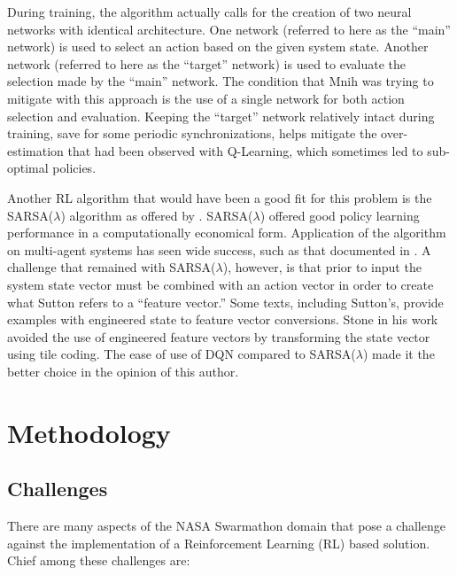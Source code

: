 \documentclass[sigconf,authordraft]{acmart}
\begin{document}
During training, the algorithm actually calls for the creation of two neural networks with identical architecture. One network (referred to here as the ``main'' network) is used to select an action based on the given system state. Another network (referred to here as the ``target'' network) is used to evaluate the selection made by the ``main'' network. The condition that Mnih was trying to mitigate with this approach is the use of a single network for both action selection and evaluation. Keeping the ``target'' network relatively intact during training, save for some periodic synchronizations, helps mitigate the over-estimation that had been observed with Q-Learning, which sometimes led to sub-optimal policies.

Another RL algorithm that would have been a good fit for this problem is the SARSA($\lambda$) algorithm as offered by \cite{sutton2018reinforcement}. SARSA($\lambda$) offered good policy learning performance in a computationally economical form. Application of the algorithm on multi-agent systems has seen wide success, such as that documented in \cite{keepaway-stone2006}. A challenge that remained with SARSA($\lambda$), however, is that prior to input the system state vector must be combined with an action vector in order to create what Sutton refers to a ``feature vector.'' Some texts, including Sutton's, provide examples with engineered state to feature vector conversions. Stone in his work avoided the use of engineered feature vectors by transforming the state vector using tile coding. The ease of use of DQN compared to SARSA($\lambda$) made it the better choice in the opinion of this author.

\section{Methodology}\label{sec:methodology}

\subsection{Challenges}\label{subsec:challenges}
There are many aspects of the NASA Swarmathon domain that pose a challenge against the implementation of a Reinforcement Learning (RL) based solution. Chief among these challenges are:
\end{document}
